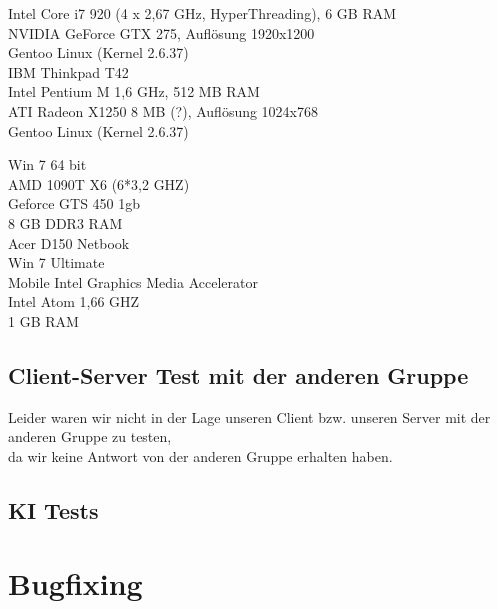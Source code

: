 \documentclass[a4paper,10pt]{article}
\begin{document}
Intel Core i7 920 (4 x 2,67 GHz, HyperThreading), 6 GB RAM \\
NVIDIA GeForce GTX 275, Auflösung 1920x1200\\
Gentoo Linux (Kernel 2.6.37)\\

IBM Thinkpad T42\\
Intel Pentium M 1,6 GHz, 512 MB RAM\\
ATI Radeon X1250 8 MB (?), Auflösung 1024x768\\
Gentoo Linux (Kernel 2.6.37)

Win 7 64 bit \\
AMD 1090T X6 (6*3,2 GHZ) \\
Geforce GTS 450 1gb \\
8 GB DDR3 RAM \\

Acer D150 Netbook\\
Win 7 Ultimate\\
Mobile Intel Graphics Media Accelerator\\
Intel Atom 1,66 GHZ\\
1 GB RAM

\subsection{Client-Server Test mit der anderen Gruppe}
Leider waren wir nicht in der Lage unseren Client bzw. unseren Server mit der anderen Gruppe zu testen, \\
da wir keine Antwort von der anderen Gruppe erhalten haben.

\subsection{KI Tests}

\section{Bugfixing}
\end{document}
